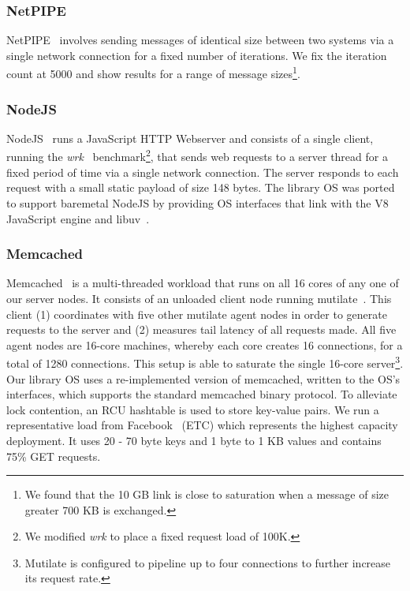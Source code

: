 \subsubsection{NetPIPE}
NetPIPE~\cite{snell1996netpipe} 
involves sending messages of identical size between two systems via a single network connection for a fixed number of iterations. We fix the iteration count at 5000 and show results for a range of message sizes\footnote{We found that the 10 GB link is close to saturation when a message of size greater 700 KB is exchanged.}.


\subsubsection{NodeJS}

NodeJS~\cite{nodejs} runs a JavaScript HTTP Webserver and consists of a single client, running the \textit{wrk}~\cite{wrk} benchmark\footnote{We modified \textit{wrk} to place a fixed request load of 100K.}, that sends web requests to a server thread for a fixed period of time via a single network connection. The server responds to each request with a small static payload of size 148 bytes. The library OS was ported to support baremetal NodeJS by providing OS interfaces that link with the V8~\cite{v8} JavaScript engine and libuv~\cite{libuv}.


\subsubsection{Memcached}
Memcached~\cite{mcd} is a multi-threaded workload that runs on all 16 cores of any one of our server nodes. It consists of an unloaded client node running mutilate~\cite{mutilate}. This client (1) coordinates with five other mutilate agent nodes in order to generate requests to the server and (2) measures tail latency of all requests made. All five agent nodes are 16-core machines, whereby each core creates 16 connections, for a total of 1280 connections. This setup is able to saturate the single 16-core server\footnote{Mutilate is configured to pipeline up to four connections to further increase its request rate.}. Our library OS uses a re-implemented version of memcached, written to the OS's interfaces, which supports the standard memcached binary protocol. To alleviate lock contention, an RCU hashtable is used to store key-value pairs. We run a representative load from Facebook~\cite{workloadanalysisfacebook} (ETC) which represents the highest capacity deployment. It uses 20 - 70 byte keys and 1 byte to 1 KB values and contains 75\% GET requests.

